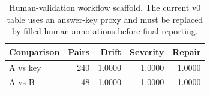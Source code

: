 \begin{table}[t]
\centering
\scriptsize
\setlength{\tabcolsep}{3pt}
\begin{tabular}{lrrrr}
\toprule
Comparison & Pairs & Drift & Severity & Repair \\
\midrule
A vs key & 240 & 1.0000 & 1.0000 & 1.0000 \\
A vs B & 48 & 1.0000 & 1.0000 & 1.0000 \\
\bottomrule
\end{tabular}
\caption{Human-validation workflow scaffold. The current v0 table uses an answer-key proxy and must be replaced by filled human annotations before final reporting.}
\label{tab:v0-human}
\end{table}
